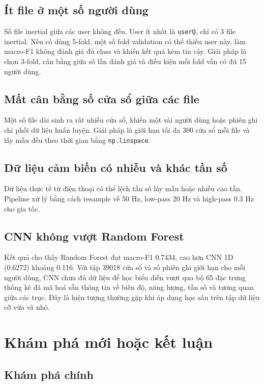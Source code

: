 \documentclass[12pt,a4paper]{article}
\begin{document}
\subsection{Ít file ở một số người dùng}

Số file inertial giữa các user không đều. User ít nhất là \texttt{userQ}, chỉ có 3 file inertial. Nếu cố dùng 5-fold, một số fold validation có thể thiếu user này, làm macro-F1 không đánh giá đủ class và khiến kết quả kém tin cậy. Giải pháp là chọn 3-fold, cân bằng giữa số lần đánh giá và điều kiện mỗi fold vẫn có đủ 15 người dùng.

\subsection{Mất cân bằng số cửa sổ giữa các file}

Một số file dài sinh ra rất nhiều cửa sổ, khiến một vài người dùng hoặc phiên ghi chi phối dữ liệu huấn luyện. Giải pháp là giới hạn tối đa 300 cửa sổ mỗi file và lấy mẫu đều theo thời gian bằng \texttt{np.linspace}.

\subsection{Dữ liệu cảm biến có nhiễu và khác tần số}

Dữ liệu thực tế từ điện thoại có thể lệch tần số lấy mẫu hoặc nhiễu cao tần. Pipeline xử lý bằng cách resample về 50 Hz, low-pass 20 Hz và high-pass 0.3 Hz cho gia tốc.

\subsection{CNN không vượt Random Forest}

Kết quả cho thấy Random Forest đạt macro-F1 0.7434, cao hơn CNN 1D (0.6272) khoảng 0.116. Với tập 39018 cửa sổ và số phiên ghi giới hạn cho mỗi người dùng, CNN chưa đủ dữ liệu để học biểu diễn vượt qua bộ 65 đặc trưng thống kê đã mã hoá sẵn thông tin về biên độ, năng lượng, tần số và tương quan giữa các trục. Đây là hiện tượng thường gặp khi áp dụng học sâu trên tập dữ liệu cỡ vừa và nhỏ.

\section{Khám phá mới hoặc kết luận}

\subsection{Khám phá chính}
\end{document}
